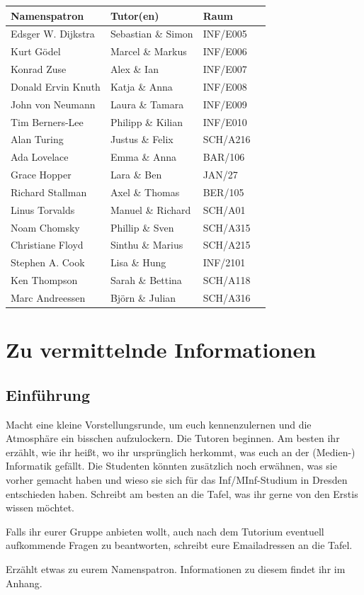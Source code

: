 \documentclass[a4paper,12pt]{report}
\begin{document}
\begin{center}
\vspace{1cm}
\begin{tabular}[h]{|l|l|l|l|}
	\hline
	\textbf{Namenspatron} & \textbf{Tutor(en)} & \textbf{Raum}\\ \hline
	Edsger W. Dijkstra & 	Sebastian \& Simon & INF/E005\\
	Kurt Gödel & Marcel \& Markus & INF/E006\\
	Konrad Zuse & Alex \& Ian & INF/E007\\
	Donald Ervin Knuth & 	Katja \& Anna & INF/E008\\
	John von Neumann & Laura \& Tamara & INF/E009\\
	Tim Berners-Lee & Philipp \& Kilian & INF/E010\\
	Alan Turing & Justus \& Felix & SCH/A216\\
	Ada Lovelace & Emma \& Anna & BAR/106\\
	Grace Hopper & Lara \& Ben & JAN/27\\
	Richard Stallman & Axel \& Thomas & BER/105\\
	Linus Torvalds & Manuel \& Richard & SCH/A01\\
	Noam Chomsky & Phillip \& Sven & SCH/A315\\
	Christiane Floyd & Sinthu \& Marius & SCH/A215\\
	Stephen A. Cook & Lisa \& Hung & INF/2101\\
	Ken Thompson & Sarah \& Bettina & SCH/A118\\
	Marc Andreessen & Björn \& Julian & SCH/A316\\
	\hline
\end{tabular}
\end{center}

\chapter{Zu vermittelnde Informationen}

\section{Einführung}
\begin{itemize*}
\item Macht eine kleine Vorstellungsrunde, um euch kennenzulernen und die Atmosphäre ein bisschen aufzulockern. 
Die Tutoren beginnen. 
Am besten ihr erzählt, wie ihr heißt, wo ihr ursprünglich herkommt, was euch an der (Medien-) Informatik gefällt. 
Die Studenten könnten zusätzlich noch erwähnen, was sie vorher gemacht haben und wieso sie sich für das Inf/MInf-Studium in Dresden entschieden haben. 
Schreibt am besten an die Tafel, was ihr gerne von den Erstis wissen möchtet.
\item Falls ihr eurer Gruppe anbieten wollt, auch nach dem Tutorium eventuell aufkommende Fragen zu beantworten, schreibt eure Emailadressen an die Tafel.
\item Erzählt etwas zu eurem Namenspatron. Informationen zu diesem findet ihr im Anhang.
\end{itemize*}
\end{document}
